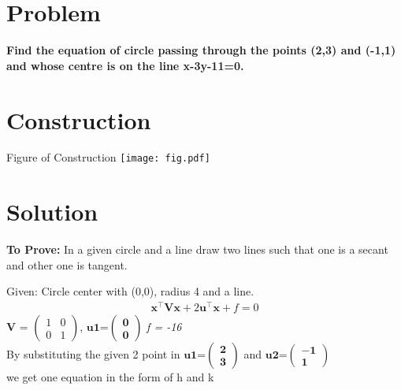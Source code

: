 \documentclass[10pt, a4paper]{article}
\let\vec\mathbf
\begin{document}
\title{\mytitle}
\author{\myauthor\hspace{1em}\\\contact\\FWC22008\hspace{6.5em}IITH\hspace{0.5em}\mymodule\hspace{6em}ASSIGN-4}
\date{}
	\maketitle
		
	\tableofcontents
\vspace{5mm}
   \section{Problem}
\textbf{Find the equation of circle passing through the points (2,3) and (-1,1) and whose centre is on the line x-3y-11=0.}
 \section{Construction}
 	\begin{center}
     Figure of Construction
     \texttt{[image: fig.pdf]} 
  	\end{center}

   \section{Solution}


\vspace{.25 cm}
\textbf{To Prove:}
In a given circle and a line draw two lines such that one is a secant and other one is tangent. 

 Given:
Circle center with (0,0), radius 4 and a line. 
\begin{align}
\vec{x}^{\top}\vec{V}\vec{x}+2\vec{u}^{\top}\vec{x}+f=0
\end{align}	
$\vec{V}$ = $\begin{pmatrix}
 1 & 0\\
 0 & 1
 \end{pmatrix}$,
 $\vec{u1}$=$\vec{\begin{pmatrix}0 \\0 \end{pmatrix}}$
 \textit{f = -16}\\
 By substituting the given 2 point in  
  $\vec{u1}$=$\vec{\begin{pmatrix}2 \\3 \end{pmatrix}}$
 and
 $\vec{u2}$=$\vec{\begin{pmatrix}-1 \\1 \end{pmatrix}}$\\
 we get one equation in the form of h and k\\
 
\end{document}
